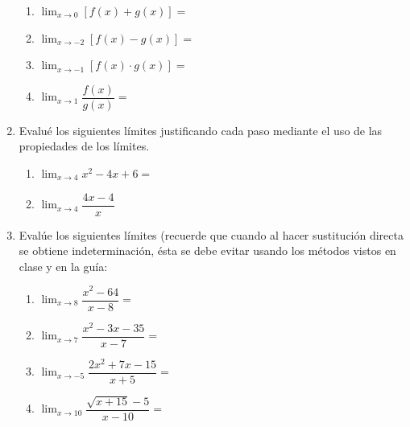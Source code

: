 \documentclass[letterpaper,fleqn]{article}
\let\ds\displaystyle
\begin{document}
\begin{enumerate}
\begin{enumerate}
\item $\ds{\lim_{x\rightarrow 0}[f(x)+g(x)]}=$
\item $\ds{\lim_{x\rightarrow -2}[f(x)-g(x)]=}$
\item $\ds{\lim_{x\rightarrow -1}[f(x)\cdot g(x)]}=$
\item $\ds{\lim_{x\rightarrow 1}\dfrac{f(x)}{g(x)}}=$
\end{enumerate}
   \item Evalué los siguientes límites justificando cada paso mediante el uso de las propiedades de los límites.
   \begin{enumerate}
   \item $\ds{\lim_{x\rightarrow 4}x^{2}-4x+6}=$\noanswer
   \item $\ds{\lim_{x\rightarrow 4}\dfrac{4x-4}{x}}$\vspace*{20pt}
   \end{enumerate}
   \item Evalúe los siguientes límites (recuerde que cuando al hacer sustitución directa se obtiene indeterminación, ésta se debe evitar usando los métodos vistos en clase y en la guía:
   \begin{enumerate}
   \item $\ds{\lim_{x\rightarrow 8}\dfrac{x^{2}-64}{x-8}}=$\noanswer
   \item $\ds{\lim_{x\rightarrow 7}\dfrac{x^{2}-3x-35}{x-7}}=$\noanswer
   \item $\ds{\lim_{x\rightarrow -5}\dfrac{2x^{2}+7x-15}{x+5}}=$\noanswer
   \item $\ds{\lim_{x\rightarrow 10}\dfrac{\sqrt{x+15}-5}{x-10}}=$\noanswer
   \end{enumerate}
 \end{enumerate}
\end{document}
